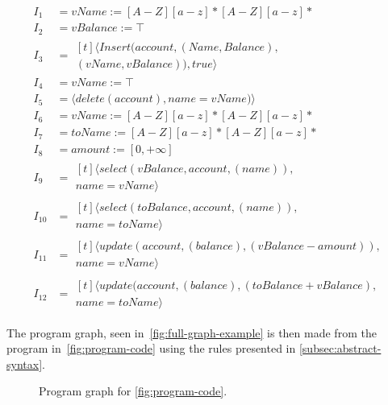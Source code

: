 \begin{align} \label{eq:example-instructions-1}
    I_1 &= vName := [A-Z][a-z]* [A-Z][a-z]* \\
    I_2 &= vBalance := \top \\
    I_3 &= \begin{gathered}[t]
        \langle Insert(account, (Name, Balance), \\
        (vName, vBalance) ), true \rangle
    \end{gathered} \\
    I_4 &=  vName := \top \\
    I_5 &= \langle delete(account), name = vName) \rangle \\
    I_6 &= vName := [A-Z][a-z]* [A-Z][a-z]* \\
    I_7 &= toName := [A-Z][a-z]* [A-Z][a-z]* \\
    I_8 &= amount := [0,+ \infty] \\
    I_9 &= \begin{gathered}[t]
        \langle select (vBalance, account, (name)), \\
        name = vName \rangle
    \end{gathered} \\
    I_{10} &= \begin{gathered}[t]
        \langle select (toBalance, account, (name)), \\
        name = toName \rangle
    \end{gathered} \\
    I_{11} &= \begin{gathered}[t]
        \langle update(account, (balance), (vBalance - amount)), \\
        name = vName \rangle
    \end{gathered} \\
    I_{12} &= \begin{gathered}[t]
        \langle update(account, (balance), (toBalance + vBalance), \\
        name = toName \rangle
    \end{gathered}
\end{align}

The program graph, seen in~\autoref{fig:full-graph-example} is then made from the program in~\autoref{fig:program-code} using the rules presented in \autoref{subsec:abstract-syntax}.

\begin{figure}
    \centering
    
    \caption{Program graph for \autoref{fig:program-code}.}
    \label{fig:full-graph-example}
\end{figure}


